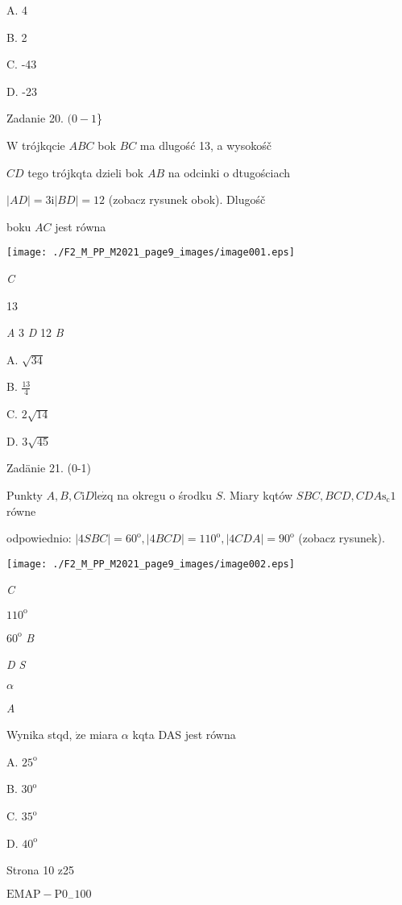 \documentclass[a4paper,12pt]{article}
\begin{document}
A. 4

B. 2

C. -43

D. -23

Zadanie 20. $(0-1$\}

$\mathrm{W}$ trójkqcie $ABC$ bok $BC$ ma dlugość 13, a wysokośč

$CD$ tego trójkqta dzieli bok $AB$ na odcinki o dtugościach

$|AD|=3 \mathrm{i} |BD|=12$ (zobacz rysunek obok). Dlugośč

boku $AC$ jest równa
\begin{center}
\texttt{[image: ./F2\_M\_PP\_M2021\_page9\_images/image001.eps]}
\end{center}
{\it C}

13

{\it A} 3  {\it D}  12  {\it B}

A. $\sqrt{34}$

B. $\displaystyle \frac{13}{4}$

C. $2\sqrt{14}$

D. $3\sqrt{45}$

Zadänie 21. (0-1)

Punkty $A, B, C \mathrm{i} D \mathrm{l}\mathrm{e}\dot{\mathrm{z}}\mathrm{q}$ na okregu o środku $S$. Miary kqtów $SBC, BCD, CDA \mathrm{s}_{\mathrm{c}}1$ równe

odpowiednio: $|4SBC|=60^{\mathrm{o}}, |4BCD|=110^{\mathrm{o}}, |4CDA|=90^{\mathrm{o}}$ (zobacz rysunek).
\begin{center}
\texttt{[image: ./F2\_M\_PP\_M2021\_page9\_images/image002.eps]}
\end{center}
{\it C}

$110^{\mathrm{o}}$

$60^{\mathrm{o}}$  {\it B}

{\it D  S}

$\alpha$

{\it A}

Wynika stqd, $\dot{\mathrm{z}}\mathrm{e}$ miara $\alpha$ kqta DAS jest równa

A. $25^{\mathrm{o}}$

B. $30^{\mathrm{o}}$

C. $35^{\mathrm{o}}$

D. $40^{\mathrm{o}}$

Strona 10 z25

$\mathrm{E}\mathrm{M}\mathrm{A}\mathrm{P}-\mathrm{P}0_{-}100$
\end{document}
